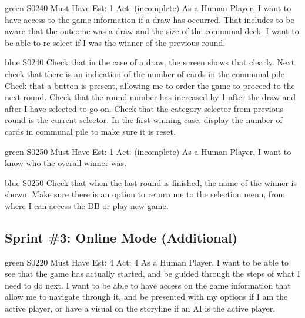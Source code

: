 
\newpage

\begin{card}{green}
{S0240}
{Must Have}
{Est: 1}
{Act: (incomplete)}
As a Human Player, I want to have access to the game information if a draw has occurred. 
That includes to be aware that the outcome was a draw and the size of the communal deck. 
I want to be able to re-select if I was the winner of the previous round. 
\end{card}

\begin{card}{blue}
{S0240}{}{}{}
Check that in the case of a draw, the screen shows that clearly. 
Next check that there is an indication of the number of cards in the communal pile Check that a button is present, allowing me to order the game to proceed to the next round. 
Check that the round number has increased by 1 after the draw and after I have selected to go on. 
Check that the category selector from previous round is the current selector. 
In the first winning case, display the number of cards in communal pile to make sure it is reset.
\end{card}


\newpage

\begin{card}{green}
{S0250}
{Must Have}
{Est: 1}
{Act: (incomplete)}
As a Human Player, I want to know who the overall winner was.
\end{card}

\begin{card}{blue}
{S0250}{}{}{}
Check that when the last round is finished, the name of the winner is shown. Make sure there is an option to return me to the selection menu, from where I can access the DB or play new game.
\end{card}


\newpage
\subsection{Sprint \#3: Online Mode (Additional)}
\label{appendix:user_stories_online_additional}
\bigskip


\begin{card}{green}
{S0220}
{Must Have}
{Est: 4}
{Act: 4}
As a Human Player, I want to be able to see that the game has actually started, and be guided through the steps of what I need to do next. 
I want to be able to have access on the game information that allow me to navigate through it, and be presented with my options if I am the active player, or have a visual on the storyline if an AI is the active player.
\end{card}

